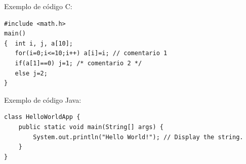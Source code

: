 Exemplo de código C:

\lstset{language=C}

\begin{lstlisting}
#include <math.h>
main()
{  int i, j, a[10];
   for(i=0;i<=10;i++) a[i]=i; // comentario 1
   if(a[1]==0) j=1; /* comentario 2 */
   else j=2;
}
\end{lstlisting}

Exemplo de código Java:

\lstset{language=java}

\begin{lstlisting}
class HelloWorldApp {
    public static void main(String[] args) {
        System.out.println("Hello World!"); // Display the string.
    }
}
\end{lstlisting}

